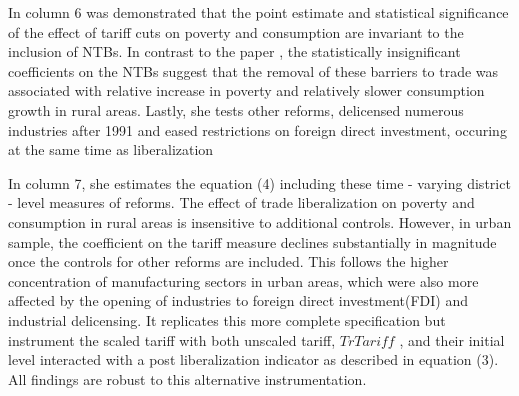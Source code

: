 \documentclass[a4paper,12pt]{article}
\begin{document}
In column 6 was demonstrated that the point estimate and statistical significance of the effect of tariff cuts on poverty and consumption are invariant to the inclusion of NTBs. In contrast to the paper \cite{Hasan07}, the statistically insignificant coefficients on the NTBs suggest that the removal of these barriers to trade was associated with relative increase in poverty and relatively slower consumption growth in rural areas. Lastly, she tests other reforms, delicensed numerous industries after 1991 and eased restrictions on foreign direct investment, occuring at the same time as liberalization 

In column 7, she estimates the equation (4) including these time - varying district - level measures of reforms. The effect of trade liberalization on poverty and consumption in rural areas is insensitive to additional controls. However, in urban sample, the coefficient on the tariff measure declines substantially in magnitude once the controls for other reforms are included. This follows the higher concentration of manufacturing sectors in urban areas, which were also more affected by the opening of industries to foreign direct investment(FDI) and industrial delicensing. It replicates this more complete specification but instrument the scaled tariff with both unscaled tariff, $TrTariff$ , and their initial level interacted with a post liberalization indicator as described in equation (3). All findings are robust to this alternative instrumentation. 
\end{document}
